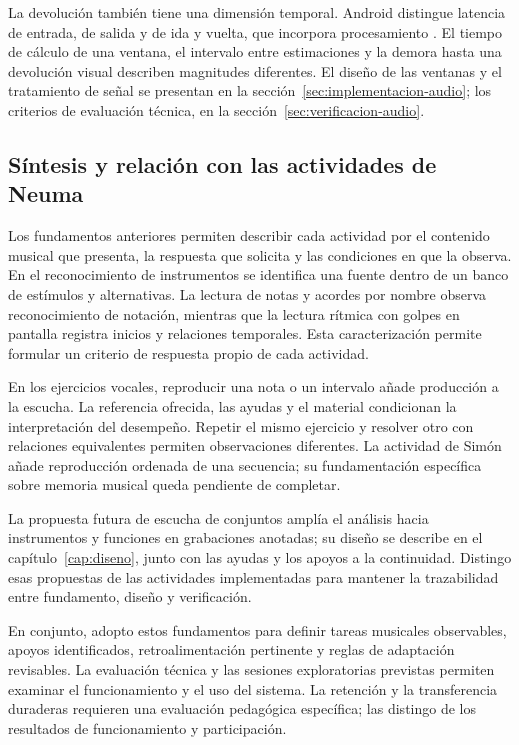 La devolución también tiene una dimensión temporal. Android distingue latencia
de entrada, de salida y de ida y vuelta, que incorpora procesamiento
\parencite{androidLatenciaAudio}. El tiempo de cálculo de una ventana, el intervalo
entre estimaciones y la demora hasta una devolución visual describen magnitudes
diferentes. El diseño de las ventanas y el tratamiento de señal se presentan en
la sección~\ref{sec:implementacion-audio}; los criterios de evaluación técnica,
en la sección~\ref{sec:verificacion-audio}.

\subsection{Síntesis y relación con las actividades de Neuma}
\label{sec:sintesis-marco}
Los fundamentos anteriores permiten describir cada actividad por el contenido
musical que presenta, la respuesta que solicita y las condiciones en que la observa.
En el reconocimiento de instrumentos se identifica una fuente dentro de un banco
de estímulos y alternativas. La lectura de notas y acordes por nombre observa
reconocimiento de notación, mientras que la lectura rítmica con golpes en pantalla
registra inicios y relaciones temporales. Esta caracterización permite formular
un criterio de respuesta propio de cada actividad.

En los ejercicios vocales, reproducir una nota o un intervalo añade producción a
la escucha. La referencia ofrecida, las ayudas y el material condicionan la
interpretación del desempeño. Repetir el mismo ejercicio y resolver otro con
relaciones equivalentes permiten observaciones diferentes. La actividad de Simón
añade reproducción ordenada de una secuencia; su fundamentación específica sobre
memoria musical queda pendiente de completar.

La propuesta futura de escucha de conjuntos amplía el análisis hacia instrumentos
y funciones en grabaciones anotadas; su diseño se describe en el
capítulo~\ref{cap:diseno}, junto con las ayudas y los apoyos a la continuidad.
Distingo esas propuestas de las actividades implementadas para mantener la
trazabilidad entre fundamento, diseño y verificación.

En conjunto, adopto estos fundamentos para definir tareas musicales observables,
apoyos identificados, retroalimentación pertinente y reglas de adaptación
revisables. La evaluación técnica y las sesiones exploratorias previstas permiten
examinar el funcionamiento y el uso del sistema. La retención y la transferencia
duraderas requieren una evaluación pedagógica específica; las distingo de los
resultados de funcionamiento y participación.

